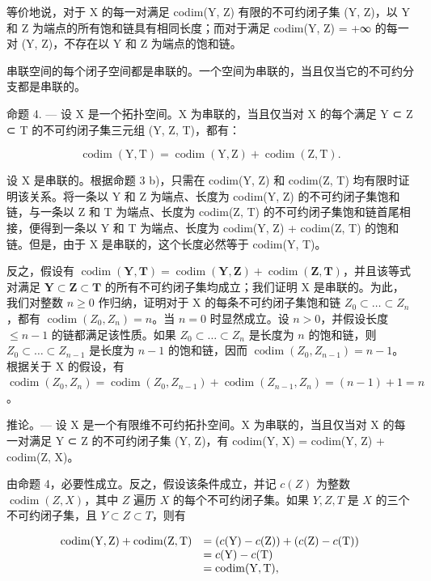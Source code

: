 等价地说，对于 X 的每一对满足 codim(Y, Z) 有限的不可约闭子集 (Y, Z)，以 Y 和 Z 为端点的所有饱和链具有相同长度；而对于满足 codim(Y, Z) = +∞ 的每一对 (Y, Z)，不存在以 Y 和 Z 为端点的饱和链。

串联空间的每个闭子空间都是串联的。一个空间为串联的，当且仅当它的不可约分支都是串联的。

命题 4. --- 设 X 是一个拓扑空间。X 为串联的，当且仅当对 X 的每个满足 Y ⊂ Z ⊂ T 的不可约闭子集三元组 (Y, Z, T)，都有：

\[
\operatorname{codim} (\mathrm{Y}, \mathrm{T}) = \operatorname{codim} (\mathrm{Y}, \mathrm{Z}) + \operatorname{codim} (\mathrm{Z}, \mathrm{T}).
\]

设 X 是串联的。根据命题 3 b)，只需在 codim(Y, Z) 和 codim(Z, T) 均有限时证明该关系。将一条以 Y 和 Z 为端点、长度为 codim(Y, Z) 的不可约闭子集饱和链，与一条以 Z 和 T 为端点、长度为 codim(Z, T) 的不可约闭子集饱和链首尾相接，便得到一条以 Y 和 T 为端点、长度为 codim(Y, Z) + codim(Z, T) 的饱和链。但是，由于 X 是串联的，这个长度必然等于 codim(Y, T)。

反之，假设有 \(\operatorname{codim}(\mathbf{Y},\mathbf{T})=\operatorname{codim}(\mathbf{Y},\mathbf{Z})+\operatorname{codim}(\mathbf{Z},\mathbf{T})\)，并且该等式对满足 \(\mathbf{Y}\subset\mathbf{Z}\subset\mathbf{T}\) 的所有不可约闭子集均成立；我们证明 X 是串联的。为此，我们对整数 \(n\geqslant0\) 作归纳，证明对于 X 的每条不可约闭子集饱和链 \(Z_{0}\subset\ldots\subset Z_{n}\)，都有 \(\operatorname{codim}(Z_{0},Z_{n})=n\)。当 \(n=0\) 时显然成立。设 \(n>0\)，并假设长度 \(\leqslant n-1\) 的链都满足该性质。如果 \(Z_{0}\subset\ldots\subset Z_{n}\) 是长度为 \(n\) 的饱和链，则 \(Z_{0}\subset\ldots\subset Z_{n-1}\) 是长度为 \(n-1\) 的饱和链，因而 \(\operatorname{codim}(Z_{0},Z_{n-1})=n-1\)。根据关于 X 的假设，有 \(\operatorname{codim}(Z_{0},Z_{n})=\operatorname{codim}(Z_{0},Z_{n-1})+\operatorname{codim}(Z_{n-1},Z_{n})=(n-1)+1=n\)。

推论。— 设 X 是一个有限维不可约拓扑空间。X 为串联的，当且仅当对 X 的每一对满足 Y ⊂ Z 的不可约闭子集 (Y, Z)，有 codim(Y, X) = codim(Y, Z) + codim(Z, X)。

由命题 4，必要性成立。反之，假设该条件成立，并记 \(c(Z)\) 为整数 \(\operatorname{codim}(Z,X)\)，其中 \(Z\) 遍历 \(X\) 的每个不可约闭子集。如果 \(Y,Z,T\) 是 \(X\) 的三个不可约闭子集，且 \(Y\subset Z\subset T\)，则有

\[
\begin{array}{r l} \operatorname{codim} (\mathrm{Y}, \mathrm{Z}) + \operatorname{codim} (\mathrm{Z}, \mathrm{T}) & = (c (\mathrm{Y}) - c (\mathrm{Z})) + (c (\mathrm{Z}) - c (\mathrm{T})) \\ & = c (\mathrm{Y}) - c (\mathrm{T}) \\ & = \operatorname{codim} (\mathrm{Y}, \mathrm{T}), \end{array}
\]

